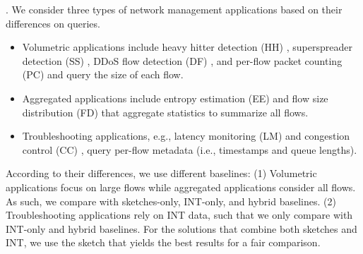 . We consider three types of network management applications based on their differences on queries.



\begin{itemize}[leftmargin=*]
%
    \item Volumetric applications include heavy hitter detection (HH) \cite{huang2017sketchvisor}, superspreader detection (SS) \cite{tang2019mv}, DDoS flow detection (DF) \cite{liu2021jaqen}, and per-flow packet counting (PC) \cite{huang2017sketchvisor} and query the size of each flow. 
%
    \item Aggregated applications include entropy estimation (EE) \cite{liu2016one} and flow size distribution (FD) \cite{chen2021mtp} that aggregate statistics to summarize all flows. %
%
    \item Troubleshooting applications, e.g., latency monitoring (LM) and congestion control (CC) \cite{ben2020pint,sheng2021deltaint}, query per-flow metadata (i.e., timestamps and queue lengths).
%
\end{itemize}

\noindent According to their differences, we use different baselines: (1) Volumetric applications focus on large flows while aggregated applications consider all flows. As such, we compare \sysname with sketches-only, INT-only, and hybrid baselines. (2) Troubleshooting applications rely on INT data, such that we only compare \sysname with INT-only and hybrid baselines. For the solutions that combine both sketches and INT, we use the sketch that yields the best results for a fair comparison. 

